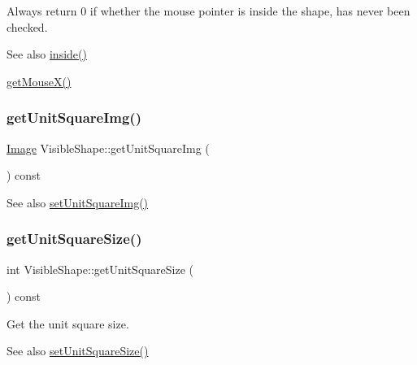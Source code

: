 Always return 0 if whether the mouse pointer is inside the shape, has never been checked. \begin{DoxySeeAlso}{See also}
\mbox{\hyperlink{class_visible_shape_aab5199578030849314f0c6a339aa4281}{inside()}} 

\mbox{\hyperlink{class_visible_shape_a53dd71f6cee05f9707d899c4e1434070}{get\+Mouse\+X()}} 
\end{DoxySeeAlso}
\mbox{\label{class_visible_shape_ab62a8320e8084bfdcc43b5c3cf072cd3}} 
\subsubsection{\texorpdfstring{get\+Unit\+Square\+Img()}{getUnitSquareImg()}}
{\footnotesize\ttfamily \mbox{\hyperlink{class_image}{Image}} Visible\+Shape\+::get\+Unit\+Square\+Img (\begin{DoxyParamCaption}{ }\end{DoxyParamCaption}) const\hspace{0.3cm}{\ttfamily [virtual]}}

\begin{DoxySeeAlso}{See also}
\mbox{\hyperlink{class_visible_shape_ae0b09cac51ba9af744cddce67fe0180a}{set\+Unit\+Square\+Img()}} 
\end{DoxySeeAlso}
\mbox{\label{class_visible_shape_a76955574eac9a5e205a2746b1343deb4}} 
\subsubsection{\texorpdfstring{get\+Unit\+Square\+Size()}{getUnitSquareSize()}}
{\footnotesize\ttfamily int Visible\+Shape\+::get\+Unit\+Square\+Size (\begin{DoxyParamCaption}{ }\end{DoxyParamCaption}) const\hspace{0.3cm}{\ttfamily [virtual]}}



Get the unit square size. 

\begin{DoxySeeAlso}{See also}
\mbox{\hyperlink{class_visible_shape_a52308c3c9134514fb6782c6f0e149914}{set\+Unit\+Square\+Size()}} 
\end{DoxySeeAlso}
\mbox{\label{class_visible_shape_a667b81608efd869c907bd342397f3eb5}} 
